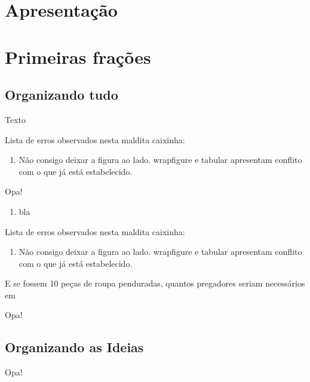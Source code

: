 \documentclass[a4,12pt]{book}
\begin{document}
\chapter{Apresentação}

\chapter{Primeiras frações}

\section{Organizando tudo}

Texto

\begin{refletindo}
  Lista de erros observados nesta maldita caixinha:
  \begin{enumerate}
   \item Não consigo deixar a figura ao lado. wrapfigure e tabular apresentam conflito com o que já está estabelecido. 
  \end{enumerate}
\end{refletindo}


\begin{refletindo}
 Opa!
 \begin{enumerate}
  \item bla
 \end{enumerate}
\end{refletindo}



\begin{refletindo}
Lista de erros observados nesta maldita caixinha:

\begin{enumerate}
 \item Não consigo deixar a figura ao lado. wrapfigure e tabular apresentam conflito com o que já está estabelecido.
\end{enumerate}
\end{refletindo}

E se fossem 10 peças de roupa penduradas, quantos pregadores seriam necessários em

\lipsum[1]

\begin{refletindo}
 Opa!
 \lipsum[1]
\end{refletindo}

\lipsum[2-4]

\section{Organizando as Ideias}
\lipsum[1]
\begin{refletindo}
 Opa!
 \lipsum[5]
\end{refletindo}
\end{document}
